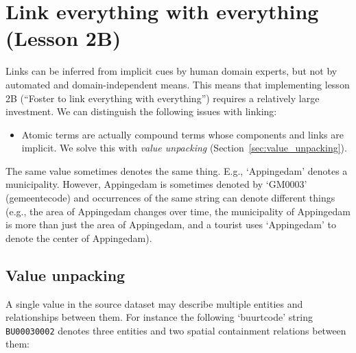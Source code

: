 \documentclass[a4paper]{scrartcl}
\newcommand{\textt}[1]{{\small \texttt{#1}}}
\begin{document}




\section{Link everything with everything (Lesson 2B)}
\label{sec:link}

Links can be inferred from implicit cues by human domain experts, but
not by automated and domain-independent means.  This means that
implementing lesson 2B (``Foster to link everything with everything'')
requires a relatively large investment.  We can distinguish the
following issues with linking:

\begin{itemize}
  \item Atomic terms are actually compound terms whose components and
    links are implicit.  We solve this with \emph{value unpacking}
    (Section~\ref{sec:value_unpacking}).
\end{itemize}

The same value sometimes denotes the same thing.  E.g., `Appingedam'
denotes a municipality.  However, Appingedam is sometimes denoted by
`GM0003' (gemeentecode) and occurrences of the same string can denote
different things (e.g., the area of Appingedam changes over time, the
municipality of Appingedam is more than just the area of Appingedam,
and a tourist uses `Appingedam' to denote the center of Appingedam).



\subsection{Value unpacking}
\label{sec:grammar}
\label{sec:value_unpacking}

A single value in the source dataset may describe multiple entities
and relationships between them.  For instance the following
`buurtcode' string \textt{BU00030002} denotes three entities and two
spatial containment relations between them:
\end{document}
